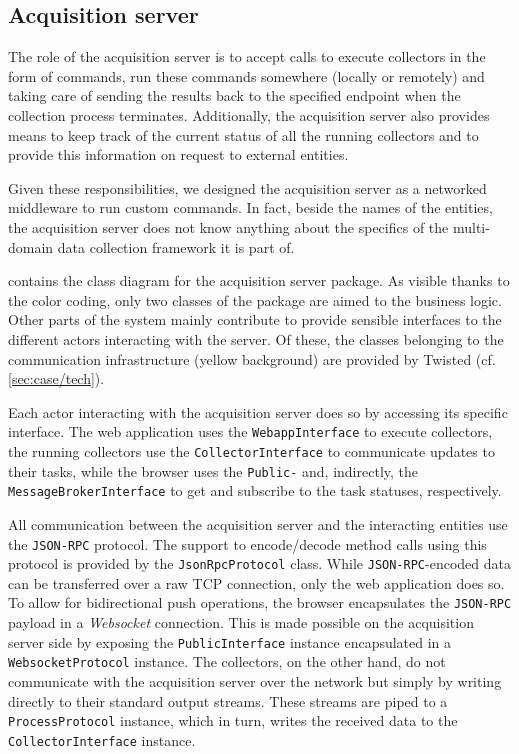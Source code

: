 \subsection{Acquisition server}
\label{sec:acquisition/design/server}

The role of the acquisition server is to accept calls to execute collectors in the form of commands, run these commands somewhere (locally or remotely) and taking care of sending the results back to the specified endpoint when the collection process terminates. Additionally, the acquisition server also provides means to keep track of the current status of all the running collectors and to provide this information on request to external entities.

Given these responsibilities, we designed the acquisition server as a networked middleware to run custom commands. In fact, beside the names of the entities, the acquisition server does not know anything about the specifics of the multi-domain data collection framework it is part of.

 contains the class diagram for the acquisition server package. As visible thanks to the color coding, only two classes of the package are aimed to the business logic. Other parts of the system mainly contribute to provide sensible interfaces to the different actors interacting with the server. Of these, the classes belonging to the communication infrastructure (yellow background) are provided by Twisted (cf. \vref{sec:case/tech}).

Each actor interacting with the acquisition server does so by accessing its specific interface. The web application uses the \texttt{WebappInterface} to execute collectors, the running collectors use the \texttt{CollectorInterface} to communicate updates to their tasks, while the browser uses the \texttt{Public-} and, indirectly, the \texttt{MessageBrokerInterface} to get and subscribe to the task statuses, respectively.

All communication between the acquisition server and the interacting entities use the \texttt{JSON-RPC} protocol. The support to encode/decode method calls using this protocol is provided by the \texttt{JsonRpcProtocol} class. While \texttt{JSON-RPC}-encoded data can be transferred over a raw TCP connection, only the web application does so. To allow for bidirectional push operations, the browser encapsulates the \texttt{JSON-RPC} payload in a \emph{Websocket} connection. This is made possible on the acquisition server side by exposing the \texttt{PublicInterface} instance encapsulated in a \texttt{WebsocketProtocol} instance. The collectors, on the other hand, do not communicate with the acquisition server over the network but simply by writing directly to their standard output streams. These streams are piped to a \texttt{ProcessProtocol} instance, which in turn, writes the received data to the \texttt{CollectorInterface} instance.

